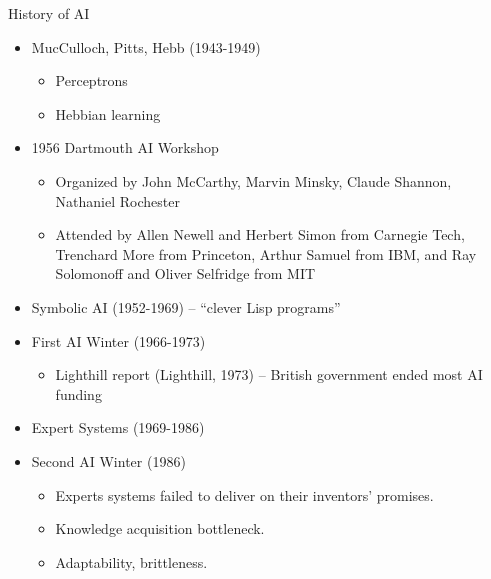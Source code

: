 \documentclass[
  10pt,
  ignorenonframetext,
  aspectratio=1610,
]{ltx-talk}
\providecommand{\tightlist}{%
  \setlength{\itemsep}{0pt}\setlength{\parskip}{0pt}}
\begin{document}
\begin{frame}{History of AI}
\protect{}\label{history-of-ai}
\begin{itemize}
\item
  MucCulloch, Pitts, Hebb (1943-1949)

  \begin{itemize}
  \tightlist
  \item
    Perceptrons
  \item
    Hebbian learning
  \end{itemize}
\item
  1956 Dartmouth AI Workshop

  \begin{itemize}
  \tightlist
  \item
    Organized by John McCarthy, Marvin Minsky, Claude Shannon, Nathaniel
    Rochester
  \item
    Attended by Allen Newell and Herbert Simon from Carnegie Tech,
    Trenchard More from Princeton, Arthur Samuel from IBM, and Ray
    Solomonoff and Oliver Selfridge from MIT
  \end{itemize}
\item
  Symbolic AI (1952-1969) -- ``clever Lisp programs''
\item
  First AI Winter (1966-1973)

  \begin{itemize}
  \tightlist
  \item
    Lighthill report (Lighthill, 1973) -- British government ended most
    AI funding
  \end{itemize}
\item
  Expert Systems (1969-1986)
\item
  Second AI Winter (1986)

  \begin{itemize}
  \tightlist
  \item
    Experts systems failed to deliver on their inventors' promises.
  \item
    Knowledge acquisition bottleneck.
  \item
    Adaptability, brittleness.
  \end{itemize}
\end{itemize}
\end{frame}
\end{document}
